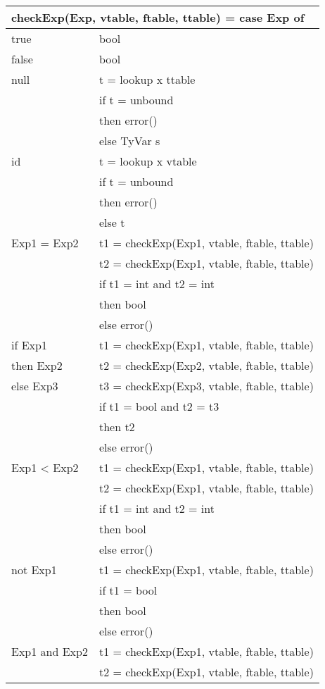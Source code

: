 \documentclass [10pt,a4paper]{article}
\begin{document}
\begin{tabular}{|l|l|}
  \hline
  \multicolumn{2}{|l|}{checkExp(Exp, vtable, ftable, ttable) = case
    Exp of} \\ \hline
   true & bool \\ \hline
  false & bool \\ \hline
  null & t = lookup x ttable \\
  & if t = unbound \\
  & then error() \\
  & else TyVar s \\ \hline
  id & t = lookup x vtable \\
  & if t = unbound \\
  & then error() \\
  & else t \\ \hline
  Exp1 = Exp2 & t1 = checkExp(Exp1, vtable, ftable, ttable) \\
  & t2 = checkExp(Exp1, vtable, ftable, ttable) \\ 
  & if t1 = int and t2 = int \\
  & then bool \\
  & else error() \\ \hline
  if Exp1 & t1 = checkExp(Exp1, vtable, ftable, ttable) \\
  then Exp2 & t2 = checkExp(Exp2, vtable, ftable, ttable) \\
  else Exp3 & t3 = checkExp(Exp3, vtable, ftable, ttable) \\
  & if t1 = bool and t2 = t3 \\
  & then t2 \\
  & else error() \\ \hline
  Exp1 < Exp2 & t1 = checkExp(Exp1, vtable, ftable, ttable) \\
  & t2 = checkExp(Exp1, vtable, ftable, ttable) \\ 
  & if t1 = int and t2 = int \\
  & then bool \\
  & else error() \\ \hline
  not Exp1 & t1 = checkExp(Exp1, vtable, ftable, ttable) \\
  & if t1 = bool \\
  & then bool \\
  & else error() \\ \hline
  Exp1 and Exp2 & t1 = checkExp(Exp1, vtable, ftable, ttable) \\
  & t2 = checkExp(Exp1, vtable, ftable, ttable) \\ 

\end{tabular}
\end{document}
